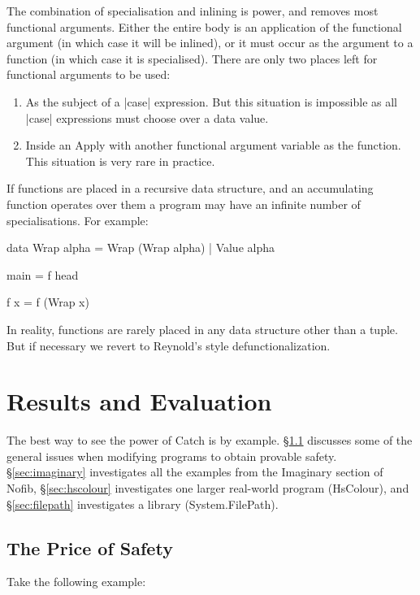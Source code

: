 \documentclass[preprint]{sigplanconf}
\newcommand{\C}[1]{\textsf{#1}}
\begin{document}
The combination of specialisation and inlining is power, and removes most functional arguments. Either the entire body is an application of the functional argument (in which case it will be inlined), or it must occur as the argument to a function (in which case it is specialised). There are only two places left for functional arguments to be used:

\begin{enumerate}
\item As the subject of a |case| expression. But this situation is impossible as all |case| expressions must choose over a data value.

\item Inside an \C{Apply} with another functional argument variable as the function. This situation is very rare in practice.
\end{enumerate}

If functions are placed in a recursive data structure, and an accumulating function operates over them a program may have an infinite number of specialisations. For example:

\begin{code}
data Wrap alpha = Wrap (Wrap alpha) | Value alpha

main = f head

f x = f (Wrap x)
\end{code}

In reality, functions are rarely placed in any data structure other than a tuple. But if necessary we revert to Reynold's style defunctionalization.

\section{Results and Evaluation}
\label{sec:results}

The best way to see the power of Catch is by example. \S\ref{sec:safety} discusses some of the general issues when modifying programs to obtain provable safety. \S\ref{sec:imaginary} investigates all the examples from the Imaginary section of Nofib, \S\ref{sec:hscolour} investigates one larger real-world program (HsColour), and \S\ref{sec:filepath} investigates a library (System.FilePath).

\subsection{The Price of Safety}
\label{sec:safety}

Take the following example:
\end{document}
